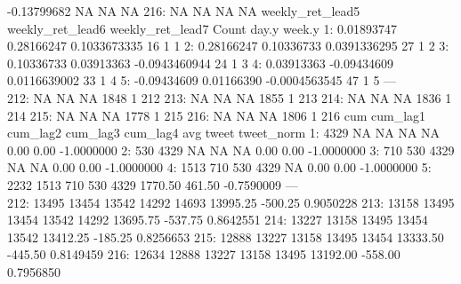 \documentclass[
]{article}
\begin{document}
-0.13799682 NA NA NA 216: NA NA NA NA weekly\_ret\_lead5
weekly\_ret\_lead6 weekly\_ret\_lead7 Count day.y week.y 1: 0.01893747
0.28166247 0.1033673335 16 1 1 2: 0.28166247 0.10336733 0.0391336295 27
1 2 3: 0.10336733 0.03913363 -0.0943460944 24 1 3 4: 0.03913363
-0.09434609 0.0116639002 33 1 4 5: -0.09434609 0.01166390 -0.0004563545
47 1 5 ---\\
212: NA NA NA 1848 1 212 213: NA NA NA 1855 1 213 214: NA NA NA 1836 1
214 215: NA NA NA 1778 1 215 216: NA NA NA 1806 1 216 cum cum\_lag1
cum\_lag2 cum\_lag3 cum\_lag4 avg tweet tweet\_norm 1: 4329 NA NA NA NA
0.00 0.00 -1.0000000 2: 530 4329 NA NA NA 0.00 0.00 -1.0000000 3: 710
530 4329 NA NA 0.00 0.00 -1.0000000 4: 1513 710 530 4329 NA 0.00 0.00
-1.0000000 5: 2232 1513 710 530 4329 1770.50 461.50 -0.7590009 ---\\
212: 13495 13454 13542 14292 14693 13995.25 -500.25 0.9050228 213: 13158
13495 13454 13542 14292 13695.75 -537.75 0.8642551 214: 13227 13158
13495 13454 13542 13412.25 -185.25 0.8256653 215: 12888 13227 13158
13495 13454 13333.50 -445.50 0.8149459 216: 12634 12888 13227 13158
13495 13192.00 -558.00 0.7956850
\end{document}
